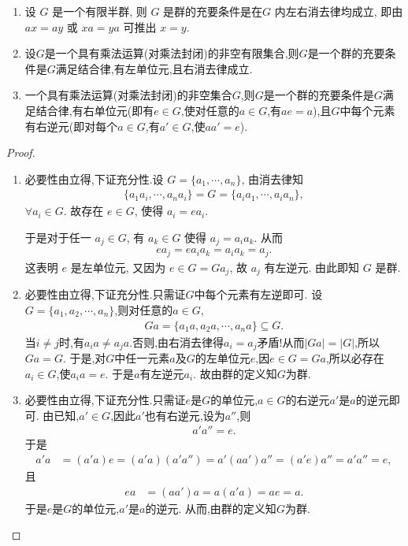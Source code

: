 \documentclass[../../main.tex]{subfiles}%
\begin{document}
\begin{theorem}
\begin{enumerate}[(1)]
\item 设 $G$ 是一个有限半群, 则 $G$ 是群的充要条件是在$G$ 内左右消去律均成立, 即由 $ax=ay$ 或 $xa=ya$ 可推出 $x=y$.

\item 设$G$是一个具有乘法运算(对乘法封闭)的非空有限集合,则$G$是一个群的充要条件是$G$满足结合律,有左单位元,且右消去律成立.

\item 一个具有乘法运算(对乘法封闭)的非空集合$G$,则$G$是一个群的充要条件是$G$满足结合律,有右单位元(即有$e \in G$,使对任意的$a \in G$,有$ae = a$),且$G$中每个元素有右逆元(即对每个$a \in G$,有$a' \in G$,使$aa' = e$).
\end{enumerate}
\end{theorem}
\begin{proof}
\begin{enumerate}[(1)]
\item 必要性由立得,下证充分性.设 $G=\{a_1,\cdots,a_n\}$, 由消去律知
\begin{align*}
\{a_1a_i,\cdots,a_na_i\}=G=\{a_ia_1,\cdots,a_ia_n\},
\end{align*}
$\forall a_i\in G$. 故存在 $e\in G$, 使得 $a_i=ea_i$.

于是对于任一 $a_j\in G$, 有 $a_k\in G$ 使得 $a_j=a_i a_k$. 从而
\begin{align*}
ea_j=ea_i a_k=a_i a_k=a_j.
\end{align*}
这表明 $e$ 是左单位元, 又因为 $e\in G=G a_j$, 故 $a_j$ 有左逆元. 由此即知 $G$ 是群.

\item 必要性由立得,下证充分性.只需证$G$中每个元素有左逆即可.
设$G = \{a_1,a_2,\cdots,a_n\}$,则对任意的$a \in G$,
\begin{align*}
Ga = \{a_1a,a_2a,\cdots,a_na\} \subseteq G.
\end{align*}
当$i \neq j$时,有$a_i a \neq a_j a$.否则,由右消去律得$a_i=a_j$矛盾!从而$|Ga| = |G|$,所以$Ga = G$. 于是,对$G$中任一元素$a$及$G$的左单位元$e$,因$e \in G = Ga$,所以必存在$a_i \in G$,使$a_i a = e$. 于是$a$有左逆元$a_i$. 故由群的定义知$G$为群.

\item 必要性由立得,下证充分性.只需证$e$是$G$的单位元,$a \in G$的右逆元$a'$是$a$的逆元即可.
由已知,$a' \in G$,因此$a'$也有右逆元,设为$a''$,则
\begin{align*}
a' a'' = e.
\end{align*}
于是
\begin{align*}
a' a &= (a' a)e = (a' a)(a' a'') = a'(aa')a'' = (a' e)a'' = a' a'' = e,
\end{align*}
且
\begin{align*}
ea &= (aa')a = a(a' a) = ae = a.
\end{align*}
于是$e$是$G$的单位元,$a'$是$a$的逆元. 从而,由群的定义知$G$为群.
\end{enumerate}

\end{proof}
\end{document}

